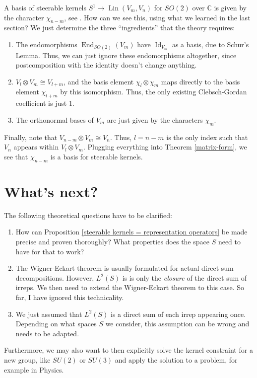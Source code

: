 \documentclass[12pt, a4paper]{article}
\theoremstyle{plain}
\theoremstyle{definition}
\theoremstyle{remark}
\newcommand{\C}{\mathds{C}}
\DeclareMathOperator{\lin}{Lin}
\DeclareMathOperator{\End}{End}
\DeclareMathOperator{\Id}{Id}
\begin{document}
A basis of steerable kernels $S^1 \to \lin(V_m, V_n)$ for $SO(2)$ over $\C$ is given by the character $\chi_{n-m}$, see \cite{hnets}. How can we see this, using what we learned in the last section? We just determine the three ``ingredients'' that the theory requires:
\begin{enumerate}
\item The endomorphisms $\End_{SO(2)}(V_m)$ have $\Id_{V_m}$ as a basis, due to Schur's Lemma. Thus, we can just ignore these endomorphisms altogether, since postcomposition with the identity doesn't change anything.
\item $V_l \otimes V_m \cong V_{l+m}$, and the basis element $\chi_l \otimes \chi_m$ maps directly to the basis element $\chi_{l+m}$ by this isomorphism. Thus, the only existing Clebsch-Gordan coefficient is just $1$.
\item The orthonormal bases of $V_m$ are just given by the characters $\chi_m$.
\end{enumerate}
Finally, note that $V_{n-m} \otimes V_m \cong V_n$. Thus, $l = n-m$ is the only index such that $V_n$ appears within $V_l \otimes V_m$. Plugging everything into Theorem \ref{matrix-form}, we see that $\chi_{n-m}$ is a basis for steerable kernels.


\section{What's next?}

The following theoretical questions have to be clarified:

\begin{enumerate}
\item How can Proposition \ref{steerable kernels = representation operators} be made precise and proven thoroughly? What properties does the space $S$ need to have for that to work?
\item The Wigner-Eckart theorem is usually formulated for actual direct sum decompositions. However, $L^2(S)$ is is only the \emph{closure} of the direct sum of irreps. We then need to extend the Wigner-Eckart theorem to this case. So far, I have ignored this technicality.
\item We just assumed that $L^2(S)$ is a direct sum of each irrep appearing once. Depending on what spaces $S$ we consider, this assumption can be wrong and needs to be adapted.
\end{enumerate}

Furthermore, we may also want to then explicitly solve the kernel constraint for a new group, like $SU(2)$ or $SU(3)$ and apply the solution to a problem, for example in Physics.
\end{document}
